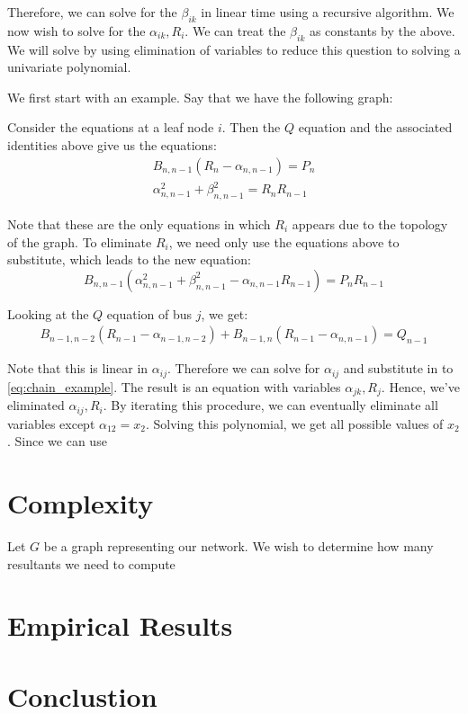 \documentclass[10pt, a4paper, twoside]{article}
\theoremstyle{plain}
\numberwithin{equation}{section}
\theoremstyle{definition}
\theoremstyle{remark}
\begin{document}
Therefore, we can solve for the $\beta_{ik}$ in linear time using a recursive algorithm. We now wish to solve for the $\alpha_{ik}, R_i$. We can treat the $\beta_{ik}$ as constants by the above. We will solve by using elimination of variables to reduce this question to solving a univariate polynomial.

We first start with an example. Say that we have the following graph:


Consider the equations at a leaf node $i$. Then the $Q$ equation and the associated identities above give us the equations:
\begin{align*}
B_{n,n-1}(R_n-\alpha_{n,n-1}) = P_n\\
\alpha_{n,n-1}^2+\beta_{n,n-1}^2 = R_nR_{n-1}\end{align*}

Note that these are the only equations in which $R_i$ appears due to the topology of the graph. To eliminate $R_i$, we need only use the equations above to substitute, which leads to the new equation:
\begin{equation}\label{eq:chain_example}
B_{n,n-1}(\alpha_{n,n-1}^2+\beta_{n,n-1}^2-\alpha_{n,n-1}R_{n-1}) = P_nR_{n-1}\end{equation}

Looking at the $Q$ equation of bus $j$, we get:
\begin{align*}
B_{n-1,n-2}(R_{n-1}-\alpha_{n-1,n-2}) + B_{n-1,n}(R_{n-1}-\alpha_{n,n-1}) = Q_{n-1}\end{align*}

Note that this is linear in $\alpha_{ij}$. Therefore we can solve for $\alpha_{ij}$ and substitute in to \ref{eq:chain_example}. The result is an equation with variables $\alpha_{jk}, R_j$. Hence, we've eliminated $\alpha_{ij}, R_i$. By iterating this procedure, we can eventually eliminate all variables except $\alpha_{12} = x_2$. Solving this polynomial, we get all possible values of $x_2$. Since we can use 


\section{Complexity}

Let $G$ be a graph representing our network. We wish to determine how many resultants we need to compute 

\section{Empirical Results}

\section{Conclustion}
\end{document}
